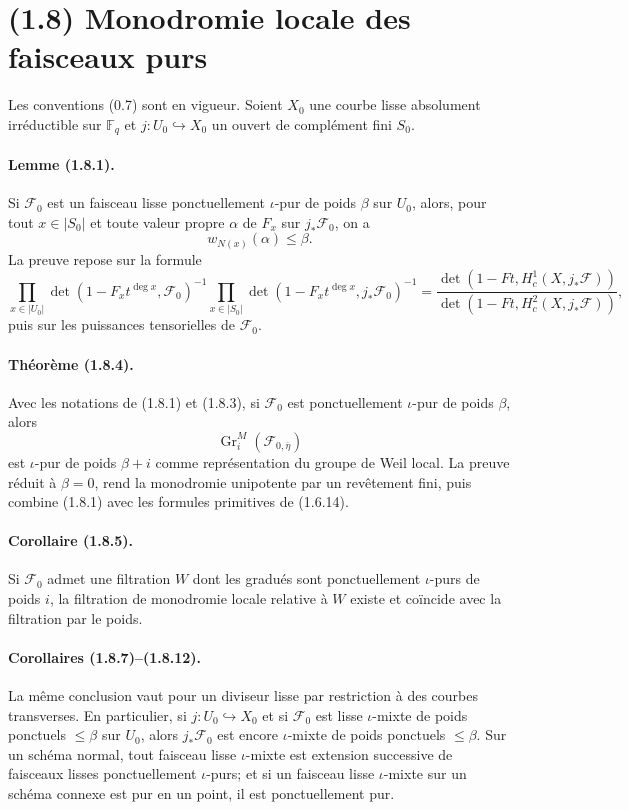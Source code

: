 \documentclass[11pt]{article}
\theoremstyle{remark}
\newcommand{\Fq}{\mathbb{F}_q}
\newcommand{\Gr}{\operatorname{Gr}}
\begin{document}
\section*{(1.8) Monodromie locale des faisceaux purs}

Les conventions (0.7) sont en vigueur. Soient $X_0$ une courbe lisse absolument irréductible sur $\Fq$ et $j:U_0\hookrightarrow X_0$ un ouvert de complément fini $S_0$.

\paragraph{Lemme (1.8.1).} Si $\mathcal F_0$ est un faisceau lisse ponctuellement $\iota$-pur de poids $\beta$ sur $U_0$, alors, pour tout $x\in |S_0|$ et toute valeur propre $\alpha$ de $F_x$ sur $j_*\mathcal F_0$, on a
\[
        w_{N(x)}(\alpha)\le\beta.
\]
La preuve repose sur la formule
\begin{equation}\tag{1.8.1.1}
\prod_{x\in |U_0|}\det(1-F_xt^{\deg x},\mathcal F_0)^{-1}
\prod_{x\in |S_0|}\det(1-F_xt^{\deg x},j_*\mathcal F_0)^{-1}
=
\frac{\det(1-Ft,H^1_c(X,j_*\mathcal F))}
{\det(1-Ft,H^2_c(X,j_*\mathcal F))},
\end{equation}
puis sur les puissances tensorielles de $\mathcal F_0$.

\paragraph{Théorème (1.8.4).} Avec les notations de (1.8.1) et (1.8.3), si $\mathcal F_0$ est ponctuellement $\iota$-pur de poids $\beta$, alors
\[
        \Gr^M_i(\mathcal F_{0,\overline\eta})
\]
est $\iota$-pur de poids $\beta+i$ comme représentation du groupe de Weil local. La preuve réduit à $\beta=0$, rend la monodromie unipotente par un revêtement fini, puis combine (1.8.1) avec les formules primitives de (1.6.14).

\paragraph{Corollaire (1.8.5).} Si $\mathcal F_0$ admet une filtration $W$ dont les gradués sont ponctuellement $\iota$-purs de poids $i$, la filtration de monodromie locale relative à $W$ existe et coïncide avec la filtration par le poids.

\paragraph{Corollaires (1.8.7)--(1.8.12).} La même conclusion vaut pour un diviseur lisse par restriction à des courbes transverses. En particulier, si $j:U_0\hookrightarrow X_0$ et si $\mathcal F_0$ est lisse $\iota$-mixte de poids ponctuels $\le\beta$ sur $U_0$, alors $j_*\mathcal F_0$ est encore $\iota$-mixte de poids ponctuels $\le\beta$. Sur un schéma normal, tout faisceau lisse $\iota$-mixte est extension successive de faisceaux lisses ponctuellement $\iota$-purs; et si un faisceau lisse $\iota$-mixte sur un schéma connexe est pur en un point, il est ponctuellement pur.
\end{document}
